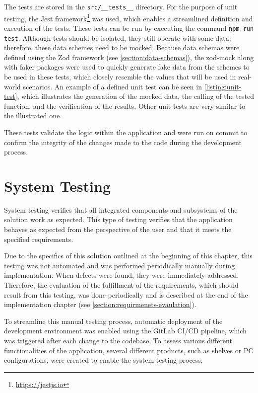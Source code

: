 The tests are stored in the \texttt{src/\_\_tests\_\_} directory. For the purpose of unit testing, the Jest framework\footnote{\url{https://jestjs.io}} was used, which enables a streamlined definition and execution of the tests. These tests can be run by executing the command \texttt{npm run test}. Although tests should be isolated, they still operate with some data; therefore, these data schemes need to be mocked. Because data schemas were defined using the Zod framework (see \autoref{section:data-schemas}), the zod-mock along with faker packages were used to quickly generate fake data from the schemes to be used in these tests, which closely resemble the values that will be used in real-world scenarios. An example of a defined unit test can be seen in \autoref{listing:unit-test}, which illustrates the generation of the mocked data, the calling of the tested function, and the verification of the results. Other unit tests are very similar to the illustrated one.

These tests validate the logic within the application and were run on commit to confirm the integrity of the changes made to the code during the development process.

\section{System Testing}

System testing verifies that all integrated components and subsystems of the solution work as expected. This type of testing verifies that the application behaves as expected from the perspective of the user and that it meets the specified requirements. \cite{Stephens2023}

Due to the specifics of this solution outlined at the beginning of this chapter, this testing was not automated and was performed periodically manually during implementation. When defects were found, they were immediately addressed. Therefore, the evaluation of the fulfillment of the requirements, which should result from this testing, was done periodically and is described at the end of the implementation chapter (see \autoref{section:requirmenets-evaulation}).

To streamline this manual testing process, automatic deployment of the development environment was enabled using the GitLab CI/CD pipeline, which was triggered after each change to the codebase. To assess various different functionalities of the application, several different products, such as shelves or PC configurations, were created to enable the system testing process. 

